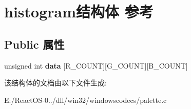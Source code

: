 \hypertarget{structhistogram}{}\section{histogram结构体 参考}
\label{structhistogram}
\subsection*{Public 属性}
\begin{DoxyCompactItemize}
\item 
\mbox{\label{structhistogram_af640cf7ad062ff18361372edab36dfd9}} 
unsigned int {\bfseries data} \mbox{[}R\+\_\+\+C\+O\+U\+NT\mbox{]}\mbox{[}G\+\_\+\+C\+O\+U\+NT\mbox{]}\mbox{[}B\+\_\+\+C\+O\+U\+NT\mbox{]}
\end{DoxyCompactItemize}


该结构体的文档由以下文件生成\+:\begin{DoxyCompactItemize}
\item 
E\+:/\+React\+O\+S-\/0../dll/win32/windowscodecs/palette.\+c\end{DoxyCompactItemize}

